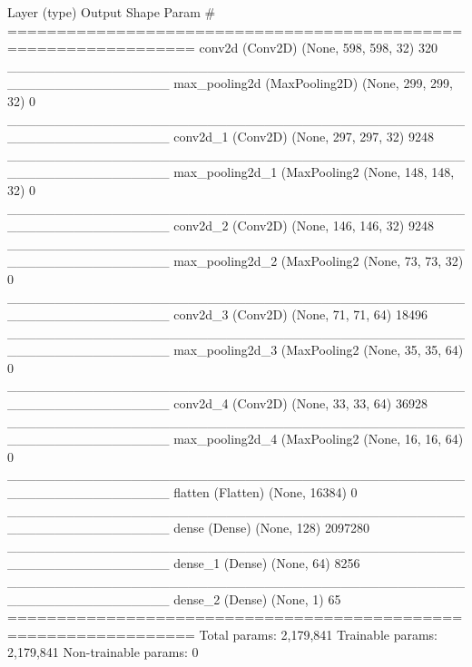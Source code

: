 \newpage

\begin{python}
  Layer (type)                 Output Shape              Param #   
  =================================================================
  conv2d (Conv2D)              (None, 598, 598, 32)      320       
  _________________________________________________________________
  max_pooling2d (MaxPooling2D) (None, 299, 299, 32)      0         
  _________________________________________________________________
  conv2d_1 (Conv2D)            (None, 297, 297, 32)      9248      
  _________________________________________________________________
  max_pooling2d_1 (MaxPooling2 (None, 148, 148, 32)      0         
  _________________________________________________________________
  conv2d_2 (Conv2D)            (None, 146, 146, 32)      9248      
  _________________________________________________________________
  max_pooling2d_2 (MaxPooling2 (None, 73, 73, 32)        0         
  _________________________________________________________________
  conv2d_3 (Conv2D)            (None, 71, 71, 64)        18496    
  _________________________________________________________________
  max_pooling2d_3 (MaxPooling2 (None, 35, 35, 64)        0         
  _________________________________________________________________
  conv2d_4 (Conv2D)            (None, 33, 33, 64)        36928     
  _________________________________________________________________
  max_pooling2d_4 (MaxPooling2 (None, 16, 16, 64)        0         
  _________________________________________________________________
  flatten (Flatten)            (None, 16384)             0         
  _________________________________________________________________
  dense (Dense)                (None, 128)               2097280   
  _________________________________________________________________
  dense_1 (Dense)              (None, 64)                8256      
  _________________________________________________________________
  dense_2 (Dense)              (None, 1)                 65        
  =================================================================
  Total params: 2,179,841
  Trainable params: 2,179,841
  Non-trainable params: 0

\end{python}
